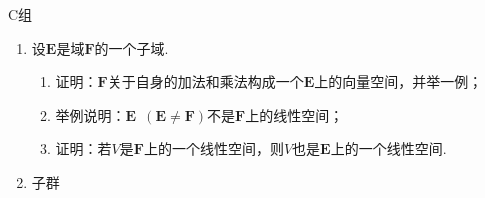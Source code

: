 \centerline{\heiti C组}
\begin{enumerate}
    \item 设$\mathbf{E}$是域$\mathbf{F}$的一个子域.
    \begin{enumerate}[label=(\arabic*)]
        \item 证明：$\mathbf{F}$关于自身的加法和乘法构成一个$\mathbf{E}$上的向量空间，并举一例；

        \item 举例说明：$\mathbf{E}\enspace(\mathbf{E}\neq \mathbf{F})$不是$\mathbf{F}$上的线性空间；

        \item 证明：若$V$是$\mathbf{F}$上的一个线性空间，则$V$也是$\mathbf{E}$上的一个线性空间.
    \end{enumerate}
    \item 子群
\end{enumerate}
